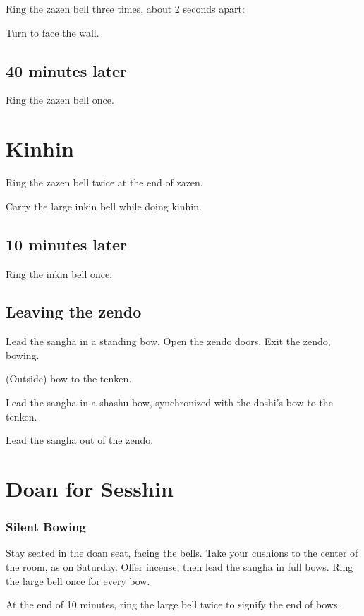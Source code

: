 \documentclass{kdo}
\begin{document}
\begin{services}
\doan Ring the zazen bell three times, about 2 seconds apart:
\startZazenBells

Turn to face the wall.

\section*{40 minutes later}

\doan Ring the zazen bell once. \bigspace\zazenbell

\chapter{Kinhin}
\doan Ring the zazen bell twice at the end of zazen.
\kinhinBells

Carry the large inkin bell while doing kinhin.

\section*{10 minutes later}

\doan Ring the inkin bell once. \bigspace\zazenbell

\section*{Leaving the zendo}
\doshi Lead the sangha in a standing bow.
\tenken Open the zendo doors.
\doshi Exit the zendo, bowing.

(Outside) bow to the tenken.

\doan Lead the sangha in a shashu bow, synchronized with the doshi's bow to the
tenken.

Lead the sangha out of the zendo.

\chapter{Doan for Sesshin}
\subsection*{Silent Bowing}
\doan Stay seated in the doan seat, facing the bells.
\sangha Take your cushions to the center of the room, as on Saturday.
\doshi Offer incense, then lead the sangha in full bows.
\doan Ring the large bell once for every bow. \bigspace\largebell

At the end of 10 minutes, ring the large bell twice to signify the end of bows.

\bline{\hfill\largebell\hfill\largebell\hfill\null}


\end{services}
\end{document}
